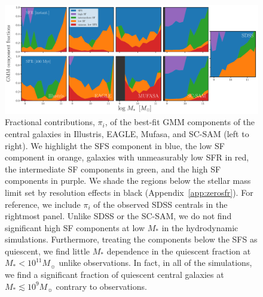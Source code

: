 \documentclass[tighten, preprint]{aastex62}
\begin{document}
\begin{figure}
\begin{center}
\includegraphics[width=\textwidth]{GMMcomp_composition.pdf} 
\caption{Fractional contributions, $\pi_i$, of the best-fit GMM components of 
    the central galaxies in Illustris, EAGLE, {\sc Mufasa}, and SC-SAM (left 
    to right). We highlight the SFS component in blue, the low SF component 
    in orange, galaxies with unmeasurably low SFR in red, the intermediate SF 
    components in green, and the high SF components in purple. We shade the 
    regions below the stellar mass limit set by resolution effects in black 
    (Appendix~\ref{app:zerosfr}). For reference, we include $\pi_i$ of the 
    observed SDSS centrals in the rightmost panel. Unlike SDSS or the SC-SAM, 
    we do not find significant high SF components at low $M_*$ in the hydrodynamic
    simulations. Furthermore, treating the components below the SFS as quiescent,
    we find little $M_*$ dependence in the quiescent fraction at $M_* < 10^{11}M_\sun$
    unlike observations. In fact, in all of the simulations, we find a significant 
    fraction of quiescent central galaxies at $M_* \lesssim 10^9 M_\sun$ contrary to observations.} \label{fig:kandinsky}
\end{center}
\end{figure}

\end{document}
